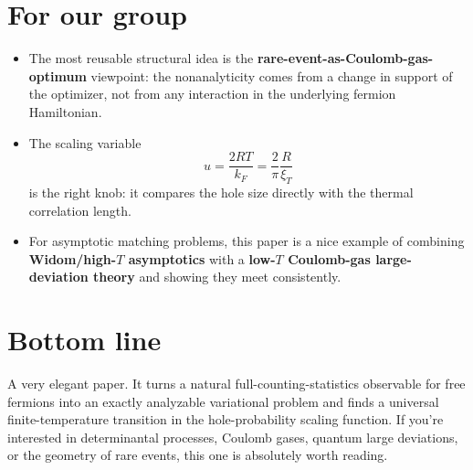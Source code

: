 \documentclass[11pt]{article}
\begin{document}
\section*{For our group}
\begin{itemize}[leftmargin=1.5em]
\item The most reusable structural idea is the \textbf{rare-event-as-Coulomb-gas-optimum} viewpoint: the nonanalyticity comes from a change in support of the optimizer, not from any interaction in the underlying fermion Hamiltonian.
\item The scaling variable
\[
u=\frac{2RT}{k_F}=\frac{2}{\pi}\frac{R}{\xi_T}
\]
is the right knob: it compares the hole size directly with the thermal correlation length.
\item For asymptotic matching problems, this paper is a nice example of combining \textbf{Widom/high-$T$ asymptotics} with a \textbf{low-$T$ Coulomb-gas large-deviation theory} and showing they meet consistently.
\end{itemize}

\section*{Bottom line}
A very elegant paper. It turns a natural full-counting-statistics observable for free fermions into an exactly analyzable variational problem and finds a universal finite-temperature transition in the hole-probability scaling function. If you're interested in determinantal processes, Coulomb gases, quantum large deviations, or the geometry of rare events, this one is absolutely worth reading.
\end{document}
